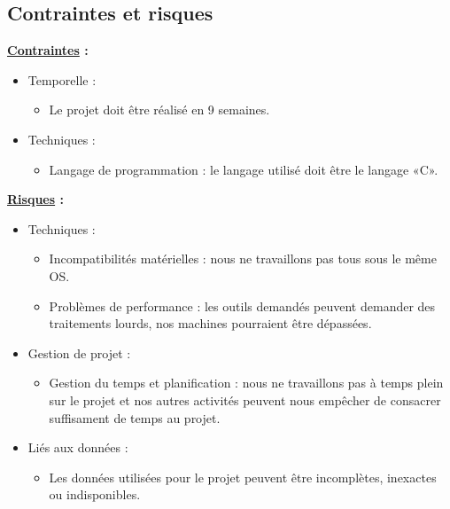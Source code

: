 \documentclass[a4paper, 12pt]{report}
\begin{document}
\subsection{Contraintes et risques}

\textbf{\underline{Contraintes} :}
\begin{itemize}
    \item Temporelle :
          \begin{itemize}
              \item Le projet doit être réalisé en 9 semaines.
          \end{itemize}
    \item Techniques :
          \begin{itemize}
              \item Langage de programmation : le langage utilisé doit être le langage «C».
          \end{itemize}
\end{itemize}
\bigskip

\textbf{\underline{Risques} :}
\begin{itemize}
    \item Techniques :
          \begin{itemize}
              \item Incompatibilités matérielles : nous ne travaillons pas tous sous le même OS.
              \item Problèmes de performance : les outils demandés peuvent demander des traitements lourds, nos machines pourraient être dépassées.
          \end{itemize}
    \item Gestion de projet :
          \begin{itemize}
              \item Gestion du temps et planification : nous ne travaillons pas à temps plein sur le projet et nos autres activités peuvent nous empêcher de consacrer suffisament de temps au projet.
          \end{itemize}
    \item Liés aux données :
          \begin{itemize}
              \item Les données utilisées pour le projet peuvent être incomplètes, inexactes ou indisponibles.
          \end{itemize}
\end{itemize}
\bigskip
\end{document}
